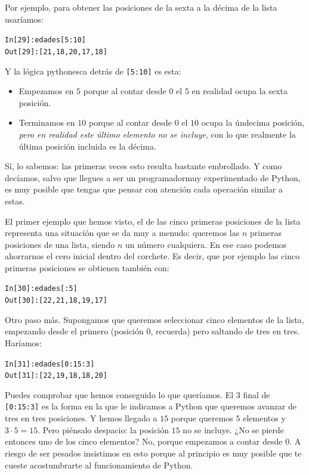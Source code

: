 \documentclass[10pt,a4paper]{article}\usepackage[]{graphicx}\usepackage[]{color}
\makeatletter
\newenvironment{kframe}{%
 \def\at@end@of@kframe{}%
 \ifinner\ifhmode%
  \def\at@end@of@kframe{\end{minipage}}%
  \begin{minipage}{\columnwidth}%
 \fi\fi%
 \def\FrameCommand##1{\hskip\@totalleftmargin \hskip-\fboxsep
 \colorbox{shadecolor}{##1}\hskip-\fboxsep
     \hskip-\linewidth \hskip-\@totalleftmargin \hskip\columnwidth}%
 \MakeFramed {\advance\hsize-\width
   \@totalleftmargin\z@ \linewidth\hsize
   \@setminipage}}%
 {\par\unskip\endMakeFramed%
 \at@end@of@kframe}
\newenvironment{knitrout}{}{} %
\newcounter {cont01}
\makeatother
\begin{document}
Por ejemplo, para obtener las posiciones de la sexta a la décima de la lista usaríamos:
\begin{knitrout}
\color{fgcolor}\begin{kframe}
\begin{alltt}
In [29]: edades[5:10]
Out[29]: [21, 18, 20, 17, 18]
\end{alltt}
\end{kframe}
\end{knitrout}
Y la lógica pythonesca detrás de {\tt [5:10]} es esta:
\begin{itemize}
\item Empezamos en $5$ porque al contar desde $0$ el $5$ en realidad ocupa la sexta posición.
\item Terminamos en $10$ porque al contar desde $0$ el $10$ ocupa la úndecima posición, {\em pero en realidad este último elemento no se incluye}, con lo que realmente la última posición incluida es la décima.
\end{itemize}
Sí, lo sabemos: las primeras veces esto resulta bastante embrollado. Y como decíamos, salvo que llegues a ser un programadormuy experimentado de Python, es muy posible que tengas que pensar con atención cada operación similar a estas.

El primer ejemplo que hemos visto, el de las cinco primeras posiciones de la lista representa una situación que se da muy a menudo: queremos las $n$ primeras posiciones de una lista, siendo $n$ un número cualquiera. En ese caso podemos ahorrarnos el cero inicial dentro del corchete. Es decir, que
por ejemplo las cinco primeras posiciones se obtienen también con:
\begin{knitrout}
\color{fgcolor}\begin{kframe}
\begin{alltt}
In [30]: edades[:5]
Out[30]: [22, 21, 18, 19, 17]
\end{alltt}
\end{kframe}
\end{knitrout}

Otro paso más. Supongamos que queremos seleccionar cinco elementos de la lista, empezando desde el primero (posición $0$, recuerda) pero saltando de tres en tres. Haríamos:
\begin{knitrout}
\color{fgcolor}\begin{kframe}
\begin{alltt}
In [31]: edades[0:15:3]
Out[31]: [22, 19, 18, 18, 20]
\end{alltt}
\end{kframe}
\end{knitrout}
Puedes comprobar que hemos conseguido lo que queríamos. El $3$ final de {\tt [0:15:3]} es la forma en la que le indicamos a Python que queremos avanzar de tres en tres posiciones. Y hemos llegado a $15$ porque queremos $5$ elementos y $3\cdot 5= 15$. Pero piénsalo despacio: la posición $15$ no se incluye. ¿No se pierde entonces uno de los cinco elementos? No, porque empezamos a contar desde $0$. A riesgo de ser pesados insistimos en esto porque al principio es muy posible que te cueste acostumbrarte al funcionamiento de Python.
\end{document}
